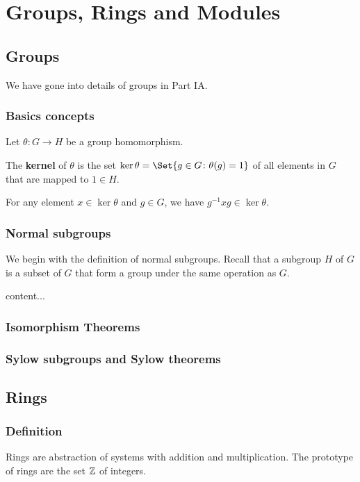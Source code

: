 \documentclass[main.tex]{subfiles}
\begin{document}
	\chapter{Groups, Rings and Modules}
		\section{Groups}
		We have gone into details of groups in Part IA.
			\subsection{Basics concepts}
			
			Let $\theta\colon G \to H$ be a group homomorphism.
			\begin{definition}
				The \textbf{kernel} of $\theta$ is the set $\ker\theta = \Set{g \in G \colon \theta(g) = 1}$ of all elements in $G$ that are mapped to $1 \in H$.
			\end{definition}
			\begin{theorem}
				For any element $x \in \ker\theta$ and $g \in G$, we have $g^{-1} x g \in \ker\theta$.
			\end{theorem}
		
			\subsection{Normal subgroups}
			We begin with the definition of normal subgroups. Recall that a subgroup $H$ of $G$ is a subset of $G$ that form a group under the same operation as $G$.
			
			\begin{definition}
				content...
			\end{definition}
			\subsection{Isomorphism Theorems}
			
			\subsection{Sylow subgroups and Sylow theorems}
		\section{Rings}
			\subsection{Definition}
			Rings are abstraction of systems with addition and multiplication. The prototype of rings are the set $\mathbb Z$ of integers.
			
\end{document}
